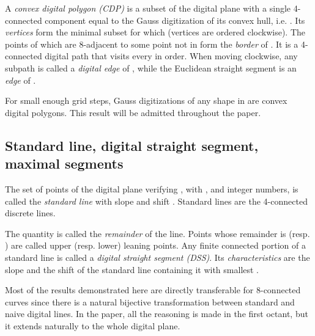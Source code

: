 \documentclass{llncs}
\begin{document}
A \emph{convex digital polygon (CDP)}  is a subset of the
digital plane  with a single 4-connected component
equal to the Gauss digitization of its convex hull, i.e. . Its {\em vertices}  form the
minimal subset for which 
(vertices are ordered clockwise). The points of  which are
8-adjacent to some point not in  form the {\em border} of
. It is a 4-connected digital path that visits every  in
order. When moving clockwise, any subpath  is
called a {\em digital edge} of , while the Euclidean straight
segment  is an {\em edge} of .

For small enough grid steps, Gauss digitizations of
any shape in  are convex digital polygons. This result will be
admitted throughout the paper.

\subsection{Standard line, digital straight segment, maximal segments}
\begin{definition} \cite{Rev91} The set of points  of the
  digital plane  verifying , with
  ,  and  integer numbers, is called the {\em standard
    line} with slope  and shift . Standard lines are the
  4-connected discrete lines.
\end{definition}

The quantity  is called the {\em remainder} of the line. Points
whose remainder is  (resp. ) are called upper
(resp. lower) leaning points. Any finite connected portion of a
standard line is called a {\em digital straight segment (DSS)}. Its
{\em characteristics} are the slope  and the shift  of the
standard line containing it with smallest .

Most of the results demonstrated here are directly transferable for
8-connected curves since there is a natural bijective transformation
between standard and naive digital lines.  In the paper, all the
reasoning is made in the first octant, but it extends naturally to the
whole digital plane.
\end{document}
